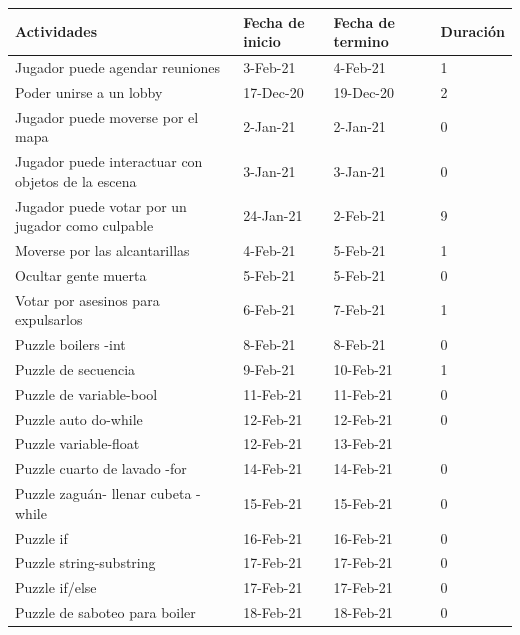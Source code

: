 \begin{table}
\centering
\begin{tabular}{llll}
Actividades                                         & Fecha de inicio & Fecha de termino   & Duración \\
\hline
Jugador puede agendar reuniones                    & 3-Feb-21  & 4-Feb-21  & 1      \\
Poder unirse a un lobby                            & 17-Dec-20 & 19-Dec-20 & 2      \\
Jugador puede moverse por el mapa                  & 2-Jan-21  & 2-Jan-21  & 0      \\
Jugador puede interactuar con objetos de la escena & 3-Jan-21  & 3-Jan-21  & 0      \\
Jugador puede votar por un jugador como culpable   & 24-Jan-21 & 2-Feb-21  & 9      \\
Moverse por las alcantarillas                      & 4-Feb-21  & 5-Feb-21  & 1      \\
Ocultar gente muerta                               & 5-Feb-21  & 5-Feb-21  & 0      \\
Votar por asesinos para expulsarlos                & 6-Feb-21  & 7-Feb-21  & 1      \\
Puzzle boilers -int                                & 8-Feb-21  & 8-Feb-21  & 0      \\
Puzzle de secuencia                                & 9-Feb-21  & 10-Feb-21 & 1      \\
Puzzle de variable-bool                            & 11-Feb-21 & 11-Feb-21 & 0      \\
Puzzle auto do-while                               & 12-Feb-21 & 12-Feb-21 & 0      \\
Puzzle variable-float                              & 12-Feb-21 & 13-Feb-21 &        \\
Puzzle cuarto de lavado -for                       & 14-Feb-21 & 14-Feb-21 & 0      \\
Puzzle zaguán- llenar cubeta -while                & 15-Feb-21 & 15-Feb-21 & 0      \\
Puzzle if                                          & 16-Feb-21 & 16-Feb-21 & 0      \\
Puzzle string-substring                            & 17-Feb-21 & 17-Feb-21 & 0      \\
Puzzle if/else                                     & 17-Feb-21 & 17-Feb-21 & 0      \\
Puzzle de saboteo para boiler                      & 18-Feb-21 & 18-Feb-21 & 0      \\

\end{tabular}
\end{table}
